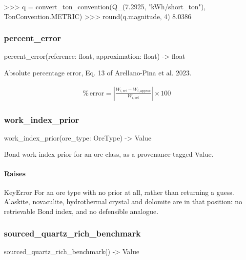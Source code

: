 \documentclass[10pt,a4paper,twoside]{report}
\begin{document}
\begin{doctestblock}
>>> q = convert_ton_convention(Q_(7.2925, "kWh/short_ton"), TonConvention.METRIC)
>>> round(q.magnitude, 4)
8.0386
\end{doctestblock}

\subsubsection*{percent\_error}

\begin{verbatimsmall}
percent_error(reference: float, approximation: float) -> float
\end{verbatimsmall}

Absolute percentage error, Eq. 13 of Arellano-Pina et al. 2023.

\begin{equation*}
\begin{gathered}
\%\,\mathrm{error} = \left| \frac{W_{i,\mathrm{ref}} - W_{i,\mathrm{approx}}}{W_{i,\mathrm{ref}}} \right| \times 100
\end{gathered}
\end{equation*}

\subsubsection*{work\_index\_prior}

\begin{verbatimsmall}
work_index_prior(ore_type: OreType) -> Value
\end{verbatimsmall}

Bond work index prior for an ore class, as a provenance-tagged Value.

\paragraph*{Raises}

KeyError For an ore type with no prior at all, rather than returning a guess. Alaskite, novaculite, hydrothermal crystal and dolomite are in that position: no retrievable Bond index, and no defensible analogue.

\subsubsection*{sourced\_quartz\_rich\_benchmark}

\begin{verbatimsmall}
sourced_quartz_rich_benchmark() -> Value
\end{verbatimsmall}
\end{document}
